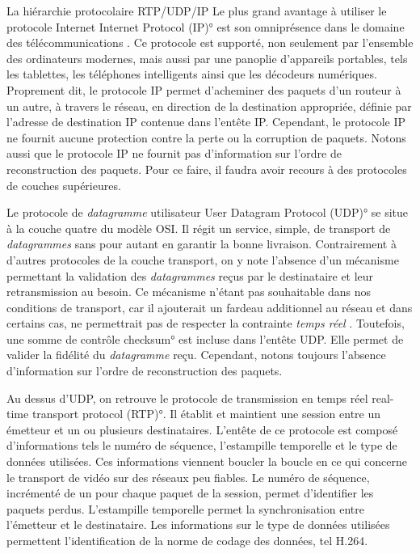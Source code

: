 \begin{section}{La hiérarchie protocolaire RTP/UDP/IP}
Le plus grand avantage à utiliser le protocole Internet \ang{Internet Protocol
(IP)} est son omniprésence dans le domaine des télécommunications
\citep{Smith2006}. Ce protocole est supporté, non seulement par l'ensemble des
ordinateurs modernes, mais aussi par une panoplie d'appareils portables, tels
les tablettes, les téléphones intelligents ainsi que les décodeurs numériques.
Proprement dit, le protocole IP permet d'acheminer des paquets d'un routeur à
un autre, à travers le réseau, en direction de la destination appropriée,
définie par l'adresse de destination IP contenue dans l'entête IP. Cependant, le
protocole IP ne fournit aucune protection contre la perte ou la corruption de
paquets. Notons aussi que le protocole IP ne fournit pas d'information sur
l'ordre de reconstruction des paquets. Pour ce faire, il faudra avoir recours à
des protocoles de couches supérieures.

Le protocole de \textit{datagramme} utilisateur \ang{User Datagram Protocol
(UDP)} se situe à la couche quatre du modèle OSI. Il régit un service, simple,
de transport de \textit{datagrammes} sans pour autant en garantir la bonne
livraison. Contrairement à d'autres protocoles de la couche transport, on y note
l'absence d'un mécanisme permettant la validation des \textit{datagrammes} reçus
par le destinataire et leur retransmission au besoin. Ce mécanisme n'étant pas
souhaitable dans nos conditions de transport, car il ajouterait un fardeau
additionnel au réseau et dans certains cas, ne permettrait pas de respecter la
contrainte \textit{temps réel} \citep{Wenger2003}. Toutefois, une somme de
contrôle \ang{checksum} est incluse dans l'entête UDP. Elle permet de valider la
fidélité du \textit{datagramme} reçu. Cependant, notons toujours l'absence
d'information sur l'ordre de reconstruction des paquets.

Au dessus d'UDP, on retrouve le protocole de transmission en temps réel \ang{
real-time transport protocol (RTP)}. Il établit et maintient une session entre
un émetteur et un ou plusieurs destinataires. L'entête de ce protocole est
composé d'informations tels le numéro de séquence, l'estampille temporelle et le
type de données utilisées. Ces informations viennent boucler la boucle en ce qui
concerne le transport de vidéo sur des réseaux peu fiables. Le numéro de
séquence, incrémenté de un pour chaque paquet de la session, permet d'identifier
les paquets perdus. L'estampille temporelle permet la synchronisation entre
l'émetteur et le destinataire. Les informations sur le type de données utilisées
permettent l'identification de la norme de codage des données, tel H.264.
\end{section}

